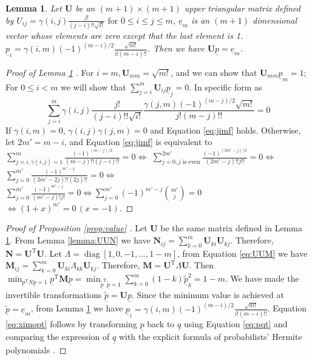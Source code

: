 \documentclass[conference]{IEEEtran}
\newtheorem{lemma}{Lemma}
\def\T{\mathrm{T}}
\DeclareMathOperator*{\diag}{diag}
\newcommand{\ide}[2]{ \gamma(#1,#2) }
\begin{document}
\begin{lemma}\label{lemma:Upem}
Let $\mathbf{U}$ be an $(m+1) \times (m+1)$ upper triangular matrix defined by
$U_{ij} = \ide{i}{j} \frac{j!}{(j-i)!!\sqrt{i!}} \textrm{ for } 0 \leq i\leq j \leq m$, $\underline{e}_m$ is an $(m+1)$ dimensional vector whose elements are zero except that the last element is 1. $\underline{p}_i = \ide{i}{m} (-1)^{(m-i)/2}\frac{\sqrt{m!}}{i!(m-i)!!}$.
Then we have $ \mathbf{U} \underline{p} = \underline{e}_m$.
\end{lemma}
\begin{proof}[Proof of Lemma \ref{lemma:Upem} ]
    For $ i = m, \mathbf{U}_{mm} = \sqrt{m!}$, and we can show that $\mathbf{U}_{mm} \underline{p}_m = 1 $; For $ 0\leq i < m $ we
    will show that $ \sum_{j=i}^m \mathbf{U}_{ij} \underline{p}_j = 0 $. In specific form as
    \begin{equation}\label{eq:jimf}
    \sum_{j=i}^m \ide{i}{j} \frac{j!}{(j-i)!!\sqrt{i!}}  \frac{\ide{j}{m}(-1)^{(m-j)/2}\sqrt{m!}}{j!(m-j)!!} = 0
    \end{equation}
    If $ \ide{i}{m} = 0$, $\ide{i}{j}\ide{j}{m} = 0$ and Equation \eqref{eq:jimf} holds. Otherwise, let $2m' = m - i$,    
    and Equation \eqref{eq:jimf} is equivalent to
    $ \sum_{j=i, \ide{i}{j}=1}^m  \frac{(-1)^{(m-j)/2}}{(m-j)!!(j-i)!!}  = 0  \iff  $
    $\sum_{j=0, j \textrm{ is even}}^{2m'}  \frac{(-1)^{(2m'-j)/2}}{(2m'-j)!! j!!}= 0  \iff $
    $\sum_{j=0}^{m'}  \frac{(-1)^{m'-j}}{(2m'-2j)!! (2j)!!} = 0  \iff $
    $\sum_{j=0}^{m'}  \frac{(-1)^{m'-j}}{(m'-j)! j!} = 0  \iff \sum_{j=0}^{m'} (-1)^{m'-j} \binom{m'}{j} = 0$
    $ \iff (1+x)^{m'} = 0 \,(x=-1)$.
\end{proof}
\begin{proof}[Proof of Proposition \ref{prop:value} ]
    Let $\mathbf{U}$ be the same matrix defined in Lemma \ref{lemma:Upem}. From Lemma \ref{lemma:UUN} we have $\mathbf{N}_{ij} = \sum_{k=0}^m \mathbf{U}_{ki}\mathbf{U}_{kj}$. Therefore, $\mathbf{N} = \mathbf{U}^\T\mathbf{U}$. Let $\Lambda = \diag[1, 0, -1, \dots, 1-m]$, from Equation \ref{eq:UUM} we have $\mathbf{M}_{ij} = \sum_{k=0}^m \mathbf{U}_{ki}\Lambda_{kk}\mathbf{U}_{kj}$. Therefore, $\mathbf{M} = \mathbf{U}^\T\Lambda\mathbf{U}$. Then $\min_{\underline{p}^\T N \underline{p} = 1} \underline{p}^\T \mathbf{M}\underline{p} = \min_{\underline{\tilde{p}}^\T\underline{\tilde{p}} = 1} \sum_{k=0}^m (1-k)\underline{\tilde{p}}_k^2 = 1-m$. We have made the invertible transformations $\underline{\tilde{p}} = \mathbf{U}\underline{p}$. Since the minimum value is achieved at $\underline{\tilde{p}} = \underline{e}_m$, from Lemma \ref{lemma:Upem} we have $\underline{p}_i = \ide{i}{m} (-1)^{(m-i)/2}\frac{\sqrt{m!}}{i!(m-i)!!}$. Equation \eqref{eq:ximopt} follows by transforming $\underline{p}$ back to $\underline{q}$ using Equation \eqref{eq:pqt} and comparing the expression of $\underline{q}$ with the explicit formula of probabilists' Hermite polynomials \cite[Eq. 18.5.13]{NIST:DLMF}.
\end{proof}
\end{document}
